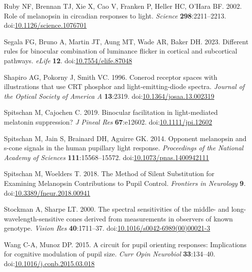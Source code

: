 \documentclass[
]{article}
\begin{document}
\leavevmode\hypertarget{ref-Ruby2002}{}%
Ruby NF, Brennan TJ, Xie X, Cao V, Franken P, Heller HC, O'Hara BF. 2002. Role of melanopsin in circadian responses to light. \emph{Science} \textbf{298}:2211--2213. doi:\href{https://doi.org/10.1126/science.1076701}{10.1126/science.1076701}

\leavevmode\hypertarget{ref-Segala2023}{}%
Segala FG, Bruno A, Martin JT, Aung MT, Wade AR, Baker DH. 2023. Different rules for binocular combination of luminance flicker in cortical and subcortical pathways. \emph{eLife} \textbf{12}. doi:\href{https://doi.org/10.7554/elife.87048}{10.7554/elife.87048}

\leavevmode\hypertarget{ref-Shapiro1996}{}%
Shapiro AG, Pokorny J, Smith VC. 1996. Conerod receptor spaces with illustrations that use CRT phosphor and light-emitting-diode spectra. \emph{Journal of the Optical Society of America A} \textbf{13}:2319. doi:\href{https://doi.org/10.1364/josaa.13.002319}{10.1364/josaa.13.002319}

\leavevmode\hypertarget{ref-Spitschan2019}{}%
Spitschan M, Cajochen C. 2019. Binocular facilitation in light-mediated melatonin suppression? \emph{J Pineal Res} \textbf{67}:e12602. doi:\href{https://doi.org/10.1111/jpi.12602}{10.1111/jpi.12602}

\leavevmode\hypertarget{ref-Spitschan2014}{}%
Spitschan M, Jain S, Brainard DH, Aguirre GK. 2014. Opponent melanopsin and s-cone signals in the human pupillary light response. \emph{Proceedings of the National Academy of Sciences} \textbf{111}:15568--15572. doi:\href{https://doi.org/10.1073/pnas.1400942111}{10.1073/pnas.1400942111}

\leavevmode\hypertarget{ref-Spitschan2018}{}%
Spitschan M, Woelders T. 2018. The Method of Silent Substitution for Examining Melanopsin Contributions to Pupil Control. \emph{Frontiers in Neurology} \textbf{9}. doi:\href{https://doi.org/10.3389/fneur.2018.00941}{10.3389/fneur.2018.00941}

\leavevmode\hypertarget{ref-Stockman2000}{}%
Stockman A, Sharpe LT. 2000. The spectral sensitivities of the middle- and long-wavelength-sensitive cones derived from measurements in observers of known genotype. \emph{Vision Res} \textbf{40}:1711--37. doi:\href{https://doi.org/10.1016/s0042-6989(00)00021-3}{10.1016/s0042-6989(00)00021-3}

\leavevmode\hypertarget{ref-Wang2015}{}%
Wang C-A, Munoz DP. 2015. A circuit for pupil orienting responses: Implications for cognitive modulation of pupil size. \emph{Curr Opin Neurobiol} \textbf{33}:134--40. doi:\href{https://doi.org/10.1016/j.conb.2015.03.018}{10.1016/j.conb.2015.03.018}
\end{document}
